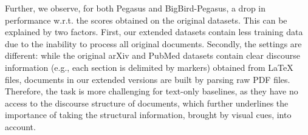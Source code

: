 Further, we observe, for both Pegasus and BigBird-Pegasus, a drop in performance w.r.t. the scores obtained on the original datasets. This can be explained by two factors. First, our extended datasets contain less training data due to the inability to process all original documents. Secondly, the settings are different: while the original arXiv and PubMed datasets contain clear discourse information (e.g., each section is delimited by markers) obtained from \LaTeX~ files, documents in our extended versions are built by parsing raw PDF files. Therefore, the task is more challenging for text-only baselines, as they have no access to the discourse structure of documents, which further underlines the importance of taking the structural information, brought by visual cues, into account.


\begin{table}[]
\centering
\small
{}
\caption{ROUGE scores on the non-English datasets. The best results for each dataset are reported in bold.}
\label{tab:chapter5-results-multilingual}
\end{table}


